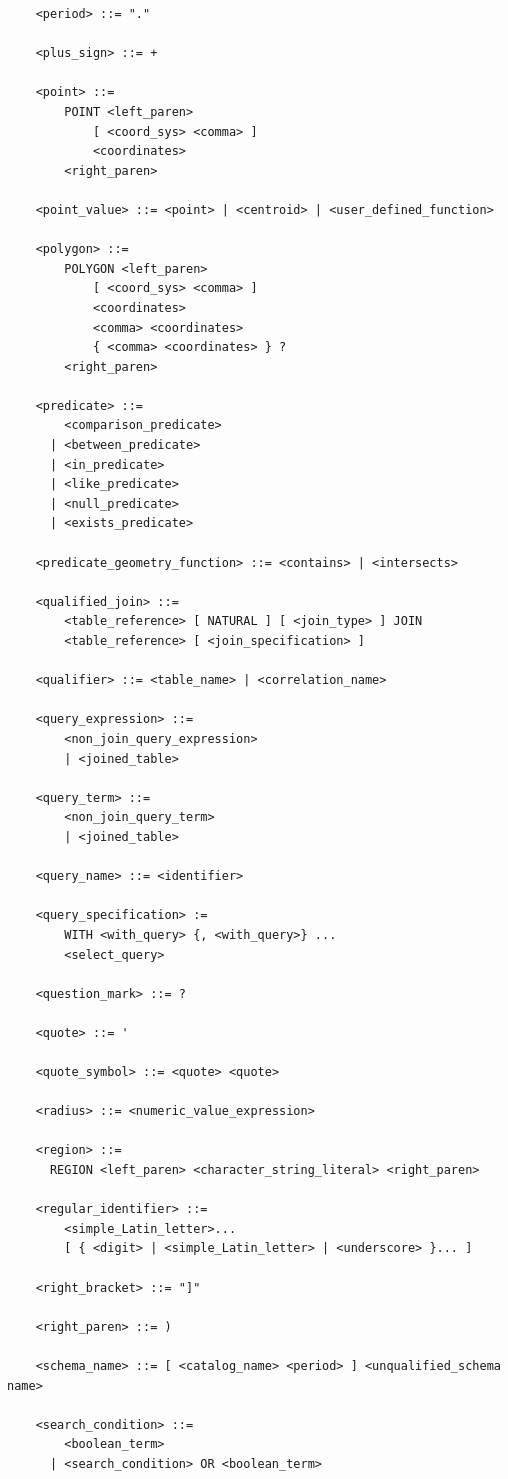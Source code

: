 \documentclass[11pt,a4paper]{ivoa}
\begin{document}
\begin{verbatim}
    <period> ::= "."

    <plus_sign> ::= +

    <point> ::=
        POINT <left_paren>
            [ <coord_sys> <comma> ]
            <coordinates>
        <right_paren>

    <point_value> ::= <point> | <centroid> | <user_defined_function>

    <polygon> ::=
        POLYGON <left_paren>
            [ <coord_sys> <comma> ]
            <coordinates>
            <comma> <coordinates>
            { <comma> <coordinates> } ?
        <right_paren>

    <predicate> ::=
        <comparison_predicate>
      | <between_predicate>
      | <in_predicate>
      | <like_predicate>
      | <null_predicate>
      | <exists_predicate>

    <predicate_geometry_function> ::= <contains> | <intersects>

    <qualified_join> ::=
        <table_reference> [ NATURAL ] [ <join_type> ] JOIN
        <table_reference> [ <join_specification> ]

    <qualifier> ::= <table_name> | <correlation_name>

    <query_expression> ::=
        <non_join_query_expression>
        | <joined_table>

    <query_term> ::=
        <non_join_query_term>
        | <joined_table>

    <query_name> ::= <identifier>

    <query_specification> :=
        WITH <with_query> {, <with_query>} ...
        <select_query>

    <question_mark> ::= ?

    <quote> ::= '

    <quote_symbol> ::= <quote> <quote>

    <radius> ::= <numeric_value_expression>

    <region> ::=
      REGION <left_paren> <character_string_literal> <right_paren>

    <regular_identifier> ::=
        <simple_Latin_letter>...
        [ { <digit> | <simple_Latin_letter> | <underscore> }... ]

    <right_bracket> ::= "]"

    <right_paren> ::= )

    <schema_name> ::= [ <catalog_name> <period> ] <unqualified_schema name>

    <search_condition> ::=
        <boolean_term>
      | <search_condition> OR <boolean_term>


\end{verbatim}
\end{document}
